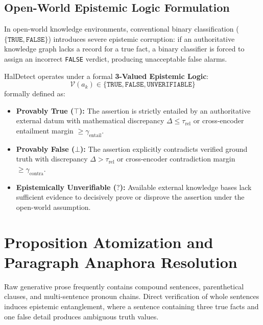 \subsection{Open-World Epistemic Logic Formulation}
In open-world knowledge environments, conventional binary classification ($\{\texttt{TRUE}, \texttt{FALSE}\}$) introduces severe epistemic corruption: if an authoritative knowledge graph lacks a record for a true fact, a binary classifier is forced to assign an incorrect \texttt{FALSE} verdict, producing unacceptable false alarms.

HalDetect operates under a formal \textbf{3-Valued Epistemic Logic}:
\begin{equation}
    \mathcal{V}(a_k) \in \{\texttt{TRUE}, \texttt{FALSE}, \texttt{UNVERIFIABLE}\}
\end{equation}
formally defined as:
\begin{itemize}
    \item \textbf{Provably True ($\top$):} The assertion is strictly entailed by an authoritative external datum with mathematical discrepancy $\Delta \le \tau_{\text{rel}}$ or cross-encoder entailment margin $\ge \gamma_{\text{entail}}$.
    \item \textbf{Provably False ($\bot$):} The assertion explicitly contradicts verified ground truth with discrepancy $\Delta > \tau_{\text{rel}}$ or cross-encoder contradiction margin $\ge \gamma_{\text{contra}}$.
    \item \textbf{Epistemically Unverifiable ($?$):} Available external knowledge bases lack sufficient evidence to decisively prove or disprove the assertion under the open-world assumption.
\end{itemize}

\section{Proposition Atomization and Paragraph Anaphora Resolution}
\label{sec:atomization_anaphora}

Raw generative prose frequently contains compound sentences, parenthetical clauses, and multi-sentence pronoun chains. Direct verification of whole sentences induces epistemic entanglement, where a sentence containing three true facts and one false detail produces ambiguous truth values.

